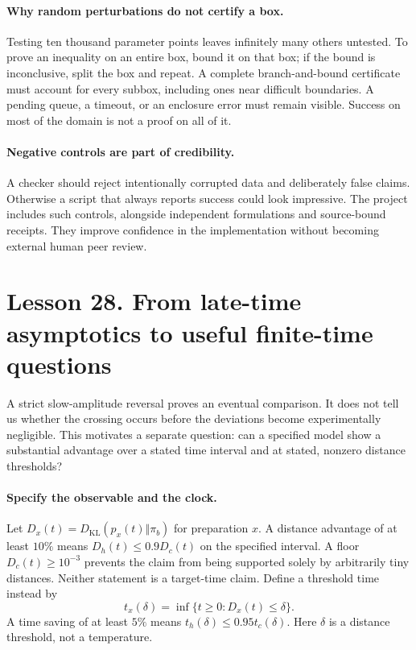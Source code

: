 \documentclass[11pt]{article}
\begin{document}
\paragraph{Why random perturbations do not certify a box.}
Testing ten thousand parameter points leaves infinitely many others
untested. To prove an inequality on an entire box, bound it on that box;
if the bound is inconclusive, split the box and repeat. A complete
branch-and-bound certificate must account for every subbox, including
ones near difficult boundaries. A pending queue, a timeout, or an enclosure
error must remain visible. Success on most of the domain is not a proof
on all of it.

\paragraph{Negative controls are part of credibility.}
A checker should reject intentionally corrupted data and deliberately
false claims. Otherwise a script that always reports success could look
impressive. The project includes such controls, alongside independent
formulations and source-bound receipts. They improve confidence in the
implementation without becoming external human peer review.

\clearpage
\section*{Lesson 28. From late-time asymptotics to useful finite-time questions}
A strict slow-amplitude reversal proves an eventual comparison. It does
not tell us whether the crossing occurs before the deviations become
experimentally negligible. This motivates a separate question: can a
specified model show a substantial advantage over a stated time interval
and at stated, nonzero distance thresholds?

\paragraph{Specify the observable and the clock.}
Let $D_x(t)=D_{\mathrm{KL}}(p_x(t)\Vert\pi_b)$ for preparation $x$.
A distance advantage of at least $10\%$ means
$D_h(t)\leq0.9D_c(t)$ on the specified interval. A floor
$D_c(t)\geq10^{-3}$ prevents the claim from being supported solely by
arbitrarily tiny distances. Neither statement is a target-time claim.
Define a threshold time instead by
\[
t_x(\delta)=\inf\{t\geq0:D_x(t)\leq\delta\}.
\]
A time saving of at least $5\%$ means $t_h(\delta)\leq0.95t_c(\delta)$.
Here $\delta$ is a distance threshold, not a temperature.
\end{document}
